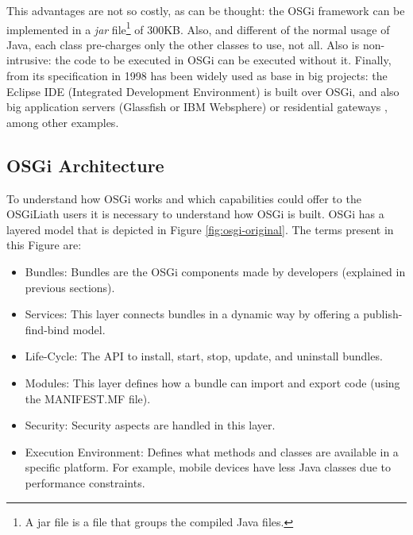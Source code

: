 \documentclass{sig-alternate}
\begin{document}
This advantages are not so
                               costly, as can be thought: the OSGi
                                framework can be implemented in a
                                {\em jar} file\footnote{A jar file is
                                a file that groups the compiled Java
                                files.} of 300KB. Also, and different
                                of the normal usage of Java, each
                                class pre-charges only the other
                                classes to use, not all. Also is
                                non-intrusive: the code to be
                                executed in OSGi can be executed
                                without it. Finally, from its
                                specification in 1998 has been widely
                                used as base in big projects: the
                                Eclipse IDE (Integrated Development
                                Environment) is built over OSGi, and
                                also big application servers
                               (Glassfish or IBM Websphere) or
                               residential gateways
                               \cite{GATEWAY}, among other
                               examples. 

\subsection{OSGi Architecture}
To understand how OSGi \cite{OSGI} works and which capabilities could offer to the OSGiLiath users it is necessary to understand how OSGi is built. OSGi has a layered model that is depicted in Figure \ref{fig:osgi-original}. The terms present in this Figure are:

\begin{itemize}
\item Bundles: Bundles are the OSGi components made by developers (explained in previous sections).
\item Services: This layer connects bundles in a dynamic way by offering a publish-find-bind model.
\item Life-Cycle: The API to install, start, stop, update, and uninstall bundles.
\item Modules: This layer defines how a bundle can import and export code (using the MANIFEST.MF file).
\item Security: Security aspects are handled in this layer.
\item Execution Environment: Defines what methods and classes are available in a specific platform. For example, mobile devices have less Java classes due to performance constraints.
\end{itemize}
\end{document}
